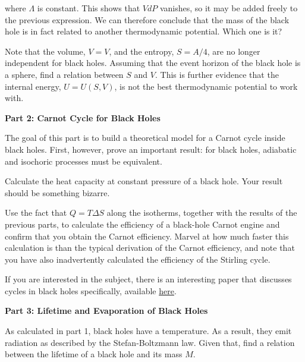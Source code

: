 \documentclass[11pt]{article}
\begin{document}
\begin{pproblem}
\begin{alternativas}
        where \(\Lambda\) is constant. This shows that \(VdP\) vanishes, so it may be added freely to the previous expression. We can therefore conclude that the mass of the black hole is in fact related to another thermodynamic potential. Which one is it?

        \item Note that the volume, \(V=V\), and the entropy, \(S = A/4\), are no longer independent for black holes. Assuming that the event horizon of the black hole is a sphere, find a relation between \(S\) and \(V\). This is further evidence that the internal energy, \(U = U(S, V)\), is not the best thermodynamic potential to work with.
    \end{alternativas}

    \centering
    \textbf{Part 2: Carnot Cycle for Black Holes}
    
    \begin{alternativas}
        \item The goal of this part is to build a theoretical model for a Carnot cycle inside black holes. First, however, prove an important result: for black holes, adiabatic and isochoric processes must be equivalent.
        
        \item Calculate the heat capacity at constant pressure of a black hole. Your result should be something bizarre.
        
        \item Use the fact that \(Q = T \Delta S\) along the isotherms, together with the results of the previous parts, to calculate the efficiency of a black-hole Carnot engine and confirm that you
        obtain the Carnot efficiency. Marvel at how much faster this calculation is than the
        typical derivation of the Carnot efficiency, and note that you have also inadvertently
        calculated the efficiency of the Stirling cycle.

        If you are interested in the subject, there is an interesting paper that discusses cycles in black holes specifically, available \href{https://arxiv.org/pdf/1404.5982}{here}.
    \end{alternativas}

    \centering
    \textbf{Part 3: Lifetime and Evaporation of Black Holes}
    
    \begin{alternativas}
        \item As calculated in part 1, black holes have a temperature. As a result, they emit radiation as described by the Stefan-Boltzmann law. Given that, find a relation between the lifetime of a black hole and its mass \(M\).
    \end{alternativas}


\end{pproblem}
\end{document}

